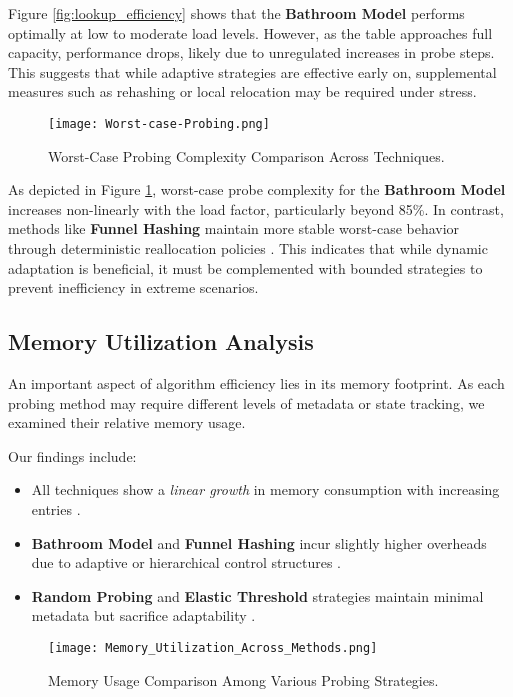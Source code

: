\documentclass[letterpaper]{article}
\begin{document}
Figure \ref{fig:lookup_efficiency} shows that the \textbf{Bathroom Model} performs optimally at low to moderate load levels. However, as the table approaches full capacity, performance drops, likely due to unregulated increases in probe steps. This suggests that while adaptive strategies are effective early on, supplemental measures such as rehashing or local relocation may be required under stress.

\begin{figure}[H]
    \centering
    \texttt{[image: Worst-case-Probing.png]}
    \caption{Worst-Case Probing Complexity Comparison Across Techniques.}
    \label{fig:worst_case}
\end{figure}

As depicted in Figure \ref{fig:worst_case}, worst-case probe complexity for the \textbf{Bathroom Model} increases non-linearly with the load factor, particularly beyond 85\%. In contrast, methods like \textbf{Funnel Hashing} maintain more stable worst-case behavior through deterministic reallocation policies \cite{mitzenmacher2005}. This indicates that while dynamic adaptation is beneficial, it must be complemented with bounded strategies to prevent inefficiency in extreme scenarios.

\subsection{Memory Utilization Analysis}

An important aspect of algorithm efficiency lies in its memory footprint. As each probing method may require different levels of metadata or state tracking, we examined their relative memory usage.

Our findings include:
\begin{itemize}
    \item All techniques show a \textit{linear growth} in memory consumption with increasing entries \cite{cormen2009}.
    \item \textbf{Bathroom Model} and \textbf{Funnel Hashing} incur slightly higher overheads due to adaptive or hierarchical control structures \cite{mitzenmacher2005}.
    \item \textbf{Random Probing} and \textbf{Elastic Threshold} strategies maintain minimal metadata but sacrifice adaptability \cite{knuth1998}.
\end{itemize}

\begin{figure}[H]
    \centering
    \texttt{[image: Memory\_Utilization\_Across\_Methods.png]}
    \caption{Memory Usage Comparison Among Various Probing Strategies.}
    \label{fig:memory_utilization}
\end{figure}
\end{document}
